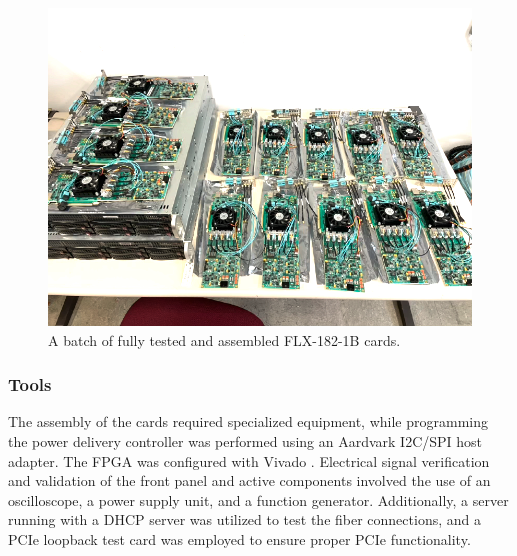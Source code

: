 \begin{figure}[H]
\centering
\includegraphics[width=\textwidth]{images/contributions/felix-cards.png}
\caption{A batch of fully tested and assembled FLX-182-1B cards.}
\label{fig:batch-felix-cards}
\end{figure}

\subsubsection{Tools}

The assembly of the cards required specialized equipment, while programming the power delivery controller was performed using an Aardvark I2C/SPI host adapter. The \acs{FPGA} was configured with Vivado \cite{vivado}. Electrical signal verification and validation of the front panel and active components involved the use of an oscilloscope, a power supply unit, and a function generator. Additionally, a server running with a \acs{DHCP} server was utilized to test the fiber connections, and a \acs{PCIe} loopback test card was employed to ensure proper \acs{PCIe} functionality.


